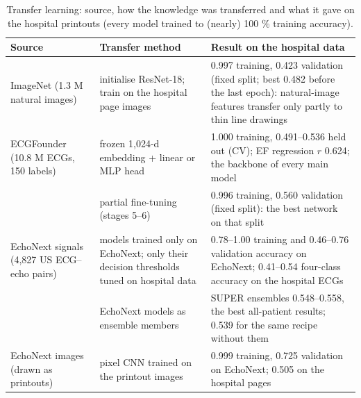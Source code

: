 \begin{table}[htbp]
\caption{Transfer learning: source, how the knowledge was transferred and what it gave on the hospital printouts (every model trained to (nearly) 100 \% training accuracy).}\label{tab:3.4}
\small
\begin{tabular}{>{\raggedright\arraybackslash\hspace{0pt}}p{}>{\raggedright\arraybackslash\hspace{0pt}}p{}>{\raggedright\arraybackslash\hspace{0pt}}p{}}
\toprule
\textbf{Source} & \textbf{Transfer method} & \textbf{Result on the hospital data} \\
\midrule
ImageNet (1.3 M natural images) & initialise ResNet-18; train on the hospital page images & 0.997 training, 0.423 validation (fixed split; best 0.482 before the last epoch): natural-image features transfer only partly to thin line drawings \\
ECGFounder (10.8 M ECGs, 150 labels) & frozen 1,024-d embedding + linear or MLP head & 1.000 training, 0.491--0.536 held out (CV); EF regression $r$ 0.624; the backbone of every main model \\
 & partial fine-tuning (stages 5--6) & 0.996 training, 0.560 validation (fixed split): the best network on that split \\
EchoNext signals (4,827 US ECG--echo pairs) & models trained only on EchoNext; only their decision thresholds tuned on hospital data & 0.78--1.00 training and 0.46--0.76 validation accuracy on EchoNext; 0.41--0.54 four-class accuracy on the hospital ECGs \\
 & EchoNext models as ensemble members & SUPER ensembles 0.548--0.558, the best all-patient results; 0.539 for the same recipe without them \\
EchoNext images (drawn as printouts) & pixel CNN trained on the printout images & 0.999 training, 0.725 validation on EchoNext; 0.505 on the hospital pages \\
\bottomrule
\end{tabular}
\end{table}
